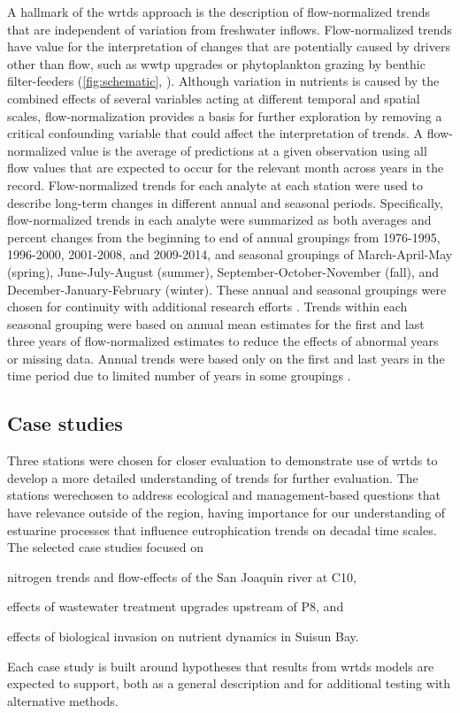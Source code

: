 \documentclass[letterpaper,12pt,oneside]{article}\usepackage[]{graphicx}\usepackage[]{color}
\begin{document}
A hallmark of the \ac{wrtds} approach is the description of flow-normalized trends that are independent of variation from freshwater inflows.  Flow-normalized trends have value for the interpretation of changes that are potentially caused by drivers other than  flow, such as \ac{wwtp} upgrades or phytoplankton grazing by benthic filter-feeders (\cref{fig:schematic}, \citealt{Beck15}). Although variation in nutrients is caused by the combined effects of several variables acting at different temporal and spatial scales, flow-normalization provides a basis for further exploration by removing a critical confounding variable that could affect the interpretation of trends. A flow-normalized value is the average of predictions at a given observation using all flow values that are expected to occur for the relevant month across years in the record.  Flow-normalized trends for each analyte at each station were used to describe long-term changes in different annual and seasonal periods.  Specifically, flow-normalized trends in each analyte were summarized as both averages and percent changes from the beginning to end of annual groupings from 1976-1995, 1996-2000, 2001-2008, and 2009-2014, and seasonal groupings of March-April-May (spring), June-July-August (summer), September-October-November (fall), and December-January-February (winter). These annual and seasonal groupings were chosen for continuity with additional research efforts \citep[i.e.,][]{Jabusch16}.  Trends within each seasonal grouping were based on annual mean estimates for the first and last three years of flow-normalized estimates to reduce the effects of abnormal years or missing data.  Annual trends were based only on the first and last years in the time period due to limited number of years in some groupings .

\subsection{Case studies}

Three stations were chosen for closer evaluation to demonstrate use of \ac{wrtds} to develop a more detailed understanding of trends for further evaluation.  The stations werechosen to address ecological and management-based questions that have relevance outside of the region, having importance for our understanding of estuarine processes that influence eutrophication trends on decadal time scales.  The selected case studies focused on \begin{inparaenum}[1\upshape)]
\item nitrogen trends and flow-effects of the San Joaquin river at C10, 
\item effects of wastewater treatment upgrades upstream of P8, and
\item effects of biological invasion on nutrient dynamics in Suisun Bay.
\end{inparaenum}
Each case study is built around hypotheses that results from \ac{wrtds} models are expected to support, both as a general description and for additional testing with alternative methods. 
\end{document}
